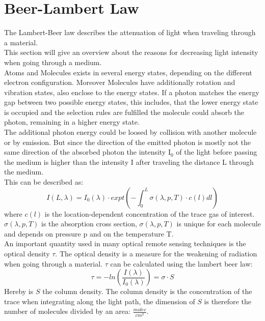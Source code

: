 \documentclass  [
  paper    = a4,
  BCOR     = 10mm,
  twoside,
  fontsize = 12pt,
  fleqn,
  toc      = bibnumbered,
  toc      = listofnumbered,
  numbers  = noendperiod,
  headings = normal,
  listof   = leveldown,
  version  = 3.03
]                                       {scrreprt}
\begin{document}
	\section*{Beer-Lambert Law}
	The Lambert-Beer law describes the attenuation of light when traveling through a material.\\
	This section will give an overview about the reasons for decreasing light intensity when going through a medium.\\
	Atoms and Molecules exists in several energy states, depending on the different electron configuration. Moreover Molecules have additionally rotation and vibration states, also enclose to the energy states. If a photon matches the energy gap between two possible energy states, this includes, that the lower energy state is occupied and the selection rules are fulfilled  the molecule could absorb the photon, remaining in a higher energy state.\\
	The additional photon energy could be loosed by collision with another molecule or by emission. But since the direction of the emitted photon is mostly not the same direction of the absorbed photon the intensity I$_{0}$ of the light before passing the medium is higher than the intensity I after traveling the distance L through the medium.\\
	This can be described as:\\ 
	\begin{equation}
	I\left(L,\lambda\right) = I_{0}\left(\lambda\right)\cdot expt\left(-\int^{L}_{0}\sigma\left(\lambda,p,T\right)\cdot c\left(l\right)dl\right)
	\end{equation}
	where $c\left(l\right)$ is the location-dependent concentration of the trace gas of interest. $\sigma\left(\lambda,p,T\right)$ is the absorption cross section, $\sigma\left(\lambda,p,T\right)$ is unique for each molecule and depends on pressure p and on the temperature T.\\
	An important quantity used in many optical remote sensing techniques is the optical density $\tau$. The optical density is a measure for the weakening of radiation when going through a material. $\tau$ can be calculated using the lambert beer law:
	\begin{equation}
	\tau = -ln\left(\frac{I\left(\lambda\right)}{I_{0}\left(\lambda\right)}\right) = \sigma\cdot S
	\end{equation}
	Hereby is $S$ the column density. The column density is the concentration of the trace when integrating along the light path, the dimension of $S$ is therefore the number of molecules divided by an area: $\frac{molec}{cm^2}$.
\end{document}
